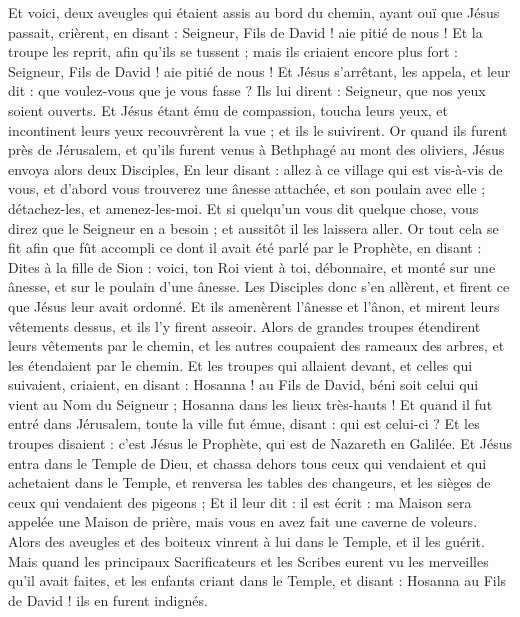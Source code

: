 \begin{multicols}{2}
Et voici, deux aveugles qui étaient assis au bord du chemin, ayant ouï que Jésus passait, crièrent, en disant : Seigneur, Fils de David ! aie pitié de nous !
Et la troupe les reprit, afin qu'ils se tussent ; mais ils criaient encore plus fort : Seigneur, Fils de David ! aie pitié de nous !
Et Jésus s'arrêtant, les appela, et leur dit : que voulez-vous que je vous fasse ?
Ils lui dirent : Seigneur, que nos yeux soient ouverts.
Et Jésus étant ému de compassion, toucha leurs yeux, et incontinent leurs yeux recouvrèrent la vue ; et ils le suivirent.
\VerseOne{}Or quand ils furent près de Jérusalem, et qu'ils furent venus à Bethphagé au mont des oliviers, Jésus envoya alors deux Disciples,
En leur disant : allez à ce village qui est vis-à-vis de vous, et d'abord vous trouverez une ânesse attachée, et son poulain avec elle ; détachez-les, et amenez-les-moi.
Et si quelqu'un vous dit quelque chose, vous direz que le Seigneur en a besoin ; et aussitôt il les laissera aller.
Or tout cela se fit afin que fût accompli ce dont il avait été parlé par le Prophète, en disant :
Dites à la fille de Sion : voici, ton Roi vient à toi, débonnaire, et monté sur une ânesse, et sur le poulain d'une ânesse.
Les Disciples donc s'en allèrent, et firent ce que Jésus leur avait ordonné.
Et ils amenèrent l'ânesse et l'ânon, et mirent leurs vêtements dessus, et ils l'y firent asseoir.
Alors de grandes troupes étendirent leurs vêtements par le chemin, et les autres coupaient des rameaux des arbres, et les étendaient par le chemin.
Et les troupes qui allaient devant, et celles qui suivaient, criaient, en disant : Hosanna ! au Fils de David, béni soit celui qui vient au Nom du Seigneur ; Hosanna dans les lieux très-hauts !
Et quand il fut entré dans Jérusalem, toute la ville fut émue, disant : qui est celui-ci ?
Et les troupes disaient : c'est Jésus le Prophète, qui est de Nazareth en Galilée.
Et Jésus entra dans le Temple de Dieu, et chassa dehors tous ceux qui vendaient et qui achetaient dans le Temple, et renversa les tables des changeurs, et les sièges de ceux qui vendaient des pigeons ;
Et il leur dit : il est écrit : ma Maison sera appelée une Maison de prière, mais vous en avez fait une caverne de voleurs.
Alors des aveugles et des boiteux vinrent à lui dans le Temple, et il les guérit.
Mais quand les principaux Sacrificateurs et les Scribes eurent vu les merveilles qu'il avait faites, et les enfants criant dans le Temple, et disant : Hosanna au Fils de David ! ils en furent indignés.

\end{multicols}
